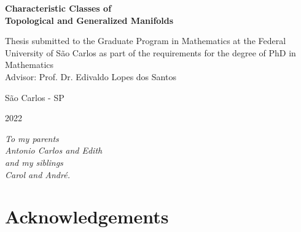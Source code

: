 \documentclass[12pt,oneside]{book}
\begin{document}
\begin{center}
    \Large{\textbf{Characteristic Classes of \\ Topological and Generalized Manifolds}}
\end{center}

\vspace{2cm}

\begin{flushright}
    \begin{minipage}{0.55\textwidth}
        Thesis submitted to the Graduate Program in Mathematics at the Federal University of São Carlos 
        as part of the requirements for the degree of PhD in Mathematics \\[0.5cm] 
        Advisor: Prof. Dr. Edivaldo Lopes dos Santos
    \end{minipage}
\end{flushright}

\vfill

\begin{center}
    São Carlos - SP
\end{center}

\vspace{-0.8cm}

\begin{center}
    2022
\end{center}



\newpage
\thispagestyle{empty}

\vspace{\fill}

\begin{flushright}
    \begin{minipage}{5cm}
        \begin{flushright}
            \vspace{22cm}\textit{To my parents \\ Antonio Carlos and Edith \\ and my siblings \\ 
            Carol and André.}
        \end{flushright}
    \end{minipage}
\end{flushright}



\newpage
\chapter*{Acknowledgements}
\thispagestyle{empty}
\
\end{document}
